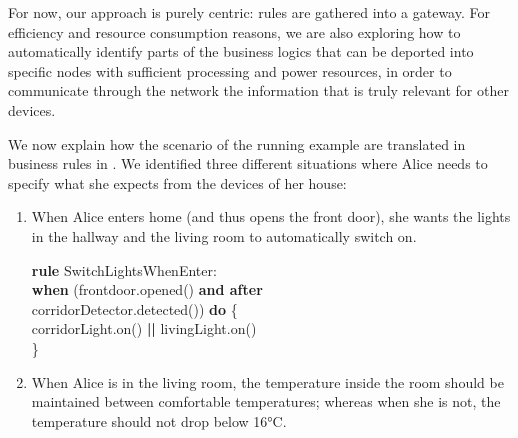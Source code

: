 For now, our approach is purely centric: rules are gathered into a gateway. For efficiency and resource consumption reasons, we are also exploring how to automatically identify parts of the business logics that can be deported into specific nodes with sufficient processing and power resources, in order to communicate through the network the information that is truly relevant for other devices.

We now explain how the scenario of the running example are translated in business rules in \IOTDSL. We identified three different situations where Alice needs to specify what she expects from the devices of her house:
\begin{enumerate}
	\item When Alice enters home (and thus opens the front door), she wants the lights in the hallway and the living room to automatically switch on. 

	\noindent
	
	\begin{small}	
		\begin{sffamily}
	\textbf{rule} SwitchLightsWhenEnter:\\
	\phantom{M}\textbf{when} (frontdoor.opened() \textbf{and after}\\
	\phantom{MMMM} corridorDetector.detected()) \textbf{do} \{\\
	\phantom{MM} corridorLight.on() \textbf{||} livingLight.on()\\ 			
	\phantom{M} \}
		\end{sffamily}
	\end{small}
	
	\item When Alice is in the living room, the temperature inside the room should be maintained between comfortable temperatures; whereas when she is not, the temperature should not drop below 16°C.
	
		\noindent
	

\end{enumerate}
